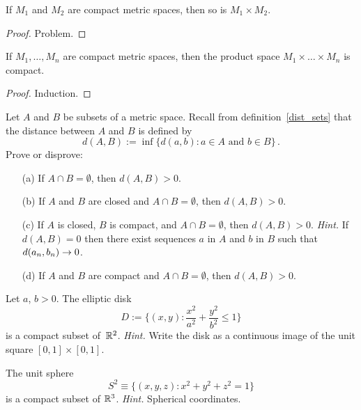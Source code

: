 \begin{thm} If $M_1$ and $M_2$ are compact metric spaces, then so is $M_1 \times M_2$.
\end{thm}

\begin{proof}  Problem.  \ns  \end{proof}

\begin{cor}\label{prod_cpt} If $M_1, \dots, M_n$ are compact metric spaces, then the product
space $M_1 \times \dots \times M_n$ is compact.
\end{cor}

\begin{proof} Induction. \end{proof}

\begin{prob} Let $A$ and $B$ be subsets of a metric space. Recall from definition~\ref{dist_sets}
that the distance between $A$ and $B$ is defined by
  \[ d(A,B) := \inf\{d(a,b) \colon a \in A \text{ and } b \in B\}\,. \]
Prove or disprove:
 \begin{enumerate}
  \item[(a)] If $A \cap B = \emptyset$, then $d(A,B) > 0$.
  \item[(b)] If $A$ and $B$ are closed and $A \cap B = \emptyset$, then $d(A,B) > 0$.
  \item[(c)] If $A$ is closed, $B$ is compact, and $A \cap B = \emptyset$, then $d(A,B) > 0$.
\emph{Hint.} If $d(A,B) = 0$ then there exist sequences $a$ in $A$ and $b$ in $B$ such that
$d(a_n,b_n) \rightarrow 0$.
  \item[(d)] If $A$ and $B$ are compact and $A \cap B = \emptyset$, then $d(A,B) > 0$.
 \end{enumerate}
\end{prob}

\begin{prob}\label{elps_cpt} Let $a$, $b > 0$.  The elliptic disk
  \[ D := \biggl\{(x,y) \colon \frac{x^2}{a^2} + \frac{y^2}{b^2} \le 1 \biggr\} \]
is a compact subset of~$\mathbb{R}^2$. \emph{Hint.} Write the disk as a continuous image of the unit
square $[0,1] \times [0,1]$.
\end{prob}

\begin{prob} The unit sphere
  \[ S^2 \equiv \{(x,y,z) \colon x^2 + y^2 + z^2 = 1\} \]
is a compact subset of $\mathbb{R}^3$. \emph{Hint.} Spherical coordinates.
\end{prob}

